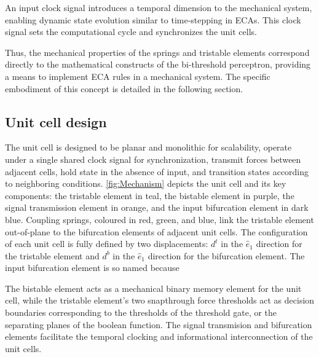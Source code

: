 An input clock signal introduces a temporal dimension to the mechanical system, enabling dynamic state evolution similar to time-stepping in ECAs. This clock signal sets the computational cycle and synchronizes the unit cells.

Thus, the mechanical properties of the springs and tristable elements correspond directly to the mathematical constructs of the bi-threshold perceptron, providing a means to implement ECA rules in a mechanical system. The specific embodiment of this concept is detailed in the following section.

\subsection*{Unit cell design}
The unit cell is designed to be planar and monolithic for scalability, operate under a single shared clock signal for synchronization, transmit forces between adjacent cells, hold state in the absence of input, and transition states according to neighboring conditions. \autoref*{fig:Mechanism} depicts the unit cell and its key components: the tristable element in teal, the bistable element in purple, the signal transmission element in orange, and the input bifurcation element in dark blue. Coupling springs, coloured in red, green, and blue, link the tristable element out-of-plane to the bifurcation elements of adjacent unit cells. The configuration of each unit cell is fully defined by two displacements: \(d^t\) in the \(\hat{e}_1\) direction for the tristable element and \(d^b\) in the \(\hat{e}_1\) direction for the bifurcation element. The input bifurcation element is so named because 

The bistable element acts as a mechanical binary memory element for the unit cell, while the tristable element's two snapthrough force thresholds act as decision boundaries corresponding to the thresholds of the threshold gate, or the separating planes of the boolean function. The signal transmision and bifurcation elements facilitate the temporal clocking and informational interconnection of the unit cells. 



